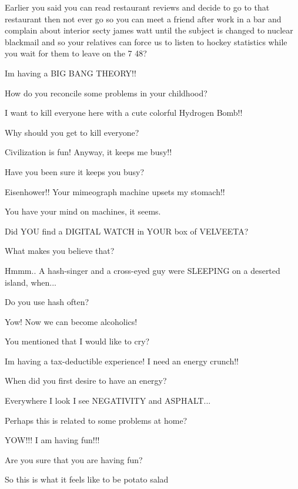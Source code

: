 \documentclass[cropmarks, frame, english]{idamasterthesis}
\begin{document}
Earlier you said you can read restaurant reviews and decide to go to
that restaurant then not ever go so you can meet a friend after work
in a bar and complain about interior secty james watt until the
subject is changed to nuclear blackmail and so your relatives can
force us to listen to hockey statistics while you wait for them to
leave on the 7 48?

Im having a BIG BANG THEORY!!

How do you reconcile some problems in your childhood?

I want to kill everyone here with a cute colorful Hydrogen Bomb!!

Why should you get to kill everyone?

Civilization is fun!  Anyway, it keeps me busy!!

Have you been sure it keeps you busy?

Eisenhower!!  Your mimeograph machine upsets my stomach!!

You have your mind on machines, it seems.

Did YOU find a DIGITAL WATCH in YOUR box of VELVEETA?

What makes you believe that?

Hmmm..  A hash-singer and a cross-eyed guy were SLEEPING on a deserted
 island, when...

Do you use hash often?

Yow!  Now we can become alcoholics!

You mentioned that I would like to cry?

Im having a tax-deductible experience!  I need an energy crunch!!

When did you first desire to have an energy?

Everywhere I look I see NEGATIVITY and ASPHALT...

Perhaps this is related to some problems at home?

YOW!!!  I am having fun!!!

Are you sure that you are having fun?

So this is what it feels like to be potato salad
\end{document}
